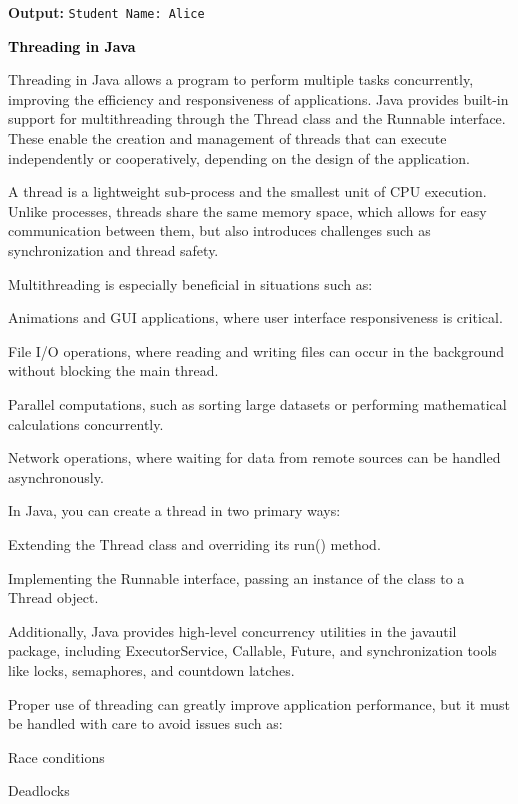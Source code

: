 \documentclass{article}
\begin{document}
\noindent\textbf{Output:} \texttt{Student Name: Alice}

\newpage
\begin{center}
    \Huge\bfseries \textcolor{black}{Threading in Java}
\end{center}
\vspace{0.5cm}

\noindent
Threading in Java allows a program to perform multiple tasks concurrently, improving the efficiency and responsiveness of applications. Java provides built-in support for multithreading through the Thread class and the Runnable interface. These enable the creation and management of threads that can execute independently or cooperatively, depending on the design of the application.

A thread is a lightweight sub-process and the smallest unit of CPU execution. Unlike processes, threads share the same memory space, which allows for easy communication between them, but also introduces challenges such as synchronization and thread safety.

Multithreading is especially beneficial in situations such as:

Animations and GUI applications, where user interface responsiveness is critical.

File I/O operations, where reading and writing files can occur in the background without blocking the main thread.

Parallel computations, such as sorting large datasets or performing mathematical calculations concurrently.

Network operations, where waiting for data from remote sources can be handled asynchronously.

In Java, you can create a thread in two primary ways:

Extending the Thread class and overriding its run() method.

Implementing the Runnable interface, passing an instance of the class to a Thread object.

Additionally, Java provides high-level concurrency utilities in the javautil package, including ExecutorService, Callable, Future, and synchronization tools like locks, semaphores, and countdown latches.

Proper use of threading can greatly improve application performance, but it must be handled with care to avoid issues such as:

Race conditions

Deadlocks
\end{document}
